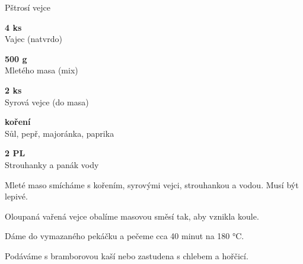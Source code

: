 \documentclass[11pt,a4paper]{article}
\begin{document}
\begin{recipe}[BrickRed]{Pštrosí vejce}
    \begin{ingredients}
        \item \parbox[t]{\linewidth}{\raggedright \piece \textbf{4 ks}\\ Vajec (natvrdo)}
        \item \parbox[t]{\linewidth}{\raggedright \weight \textbf{500 g}\\ Mletého masa (mix)}
        \item \parbox[t]{\linewidth}{\raggedright \piece \textbf{2 ks}\\ Syrová vejce (do masa)}
        \item \parbox[t]{\linewidth}{\raggedright \indefinite \textbf{koření}\\ Sůl, pepř, majoránka, paprika}
        \item \parbox[t]{\linewidth}{\raggedright \spoon \textbf{2 PL}\\ Strouhanky a panák vody}
    \end{ingredients}
    \begin{steps}
        \item Mleté maso smícháme s kořením, syrovými vejci, strouhankou a vodou. Musí být lepivé.
        \item Oloupaná vařená vejce obalíme masovou směsí tak, aby vznikla koule.
        \item Dáme do vymazaného pekáčku a pečeme cca 40 minut na 180 °C.
        \item Podáváme s bramborovou kaší nebo zastudena s chlebem a hořčicí.
    \end{steps}
\end{recipe}
\end{document}
